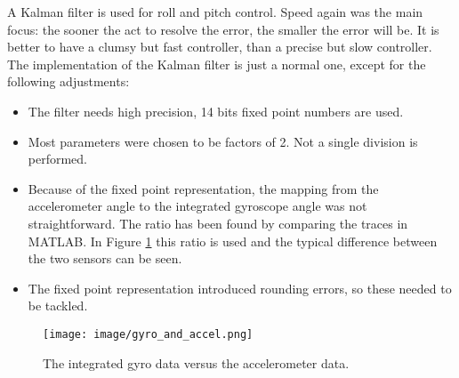 \documentclass[a4paper]{article}
\begin{document}
A Kalman filter is used for roll and pitch control. Speed again was the main focus: the sooner the act to resolve the error, the smaller the error will be. It is better to have a clumsy but fast controller, than a precise but slow controller. The implementation of the Kalman filter is just a normal one, except for the following adjustments:
\begin{itemize}
\setlength\itemsep{0em}
\item The filter needs high precision, 14 bits fixed point numbers are used.
\item Most parameters were chosen to be factors of 2. Not a single division is performed.
\item Because of the fixed point representation, the mapping from the accelerometer angle to the integrated gyroscope angle was not straightforward. The ratio has been found by comparing the traces in MATLAB. In Figure \ref{fig:kaleman} this ratio is used and the typical difference between the two sensors can be seen.
\item The fixed point representation introduced rounding errors, so these needed to be tackled.
\end{itemize}

\begin{figure}[h!]
  \centering
  \texttt{[image: image/gyro\_and\_accel.png]}
  \caption{The integrated gyro data versus the accelerometer data.}
  \label{fig:kaleman}
\end{figure}
\end{document}
